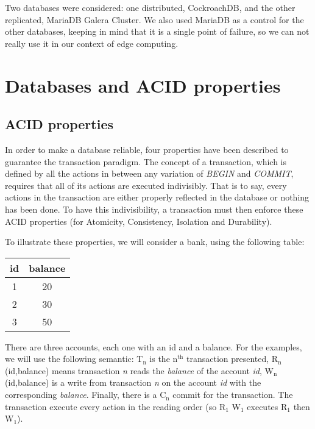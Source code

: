 Two databases were considered: one distributed, CockroachDB, and the other replicated, MariaDB Galera Cluster. We also used MariaDB as a control for the other databases, keeping in mind that it is a single point of failure, so we can not really use it in our context of edge computing.


\section{Databases and ACID properties}

\subsection{ACID properties}
In order to make a database reliable, four properties have been described to guarantee the transaction paradigm. The concept of a transaction, which is defined by all the actions in between any variation of \emph{BEGIN} and \emph{COMMIT}, requires that all of its actions are executed indivisibly. That is to say, every actions in the transaction are either properly reflected in the database or nothing has been done\cite{DBLP:journals/csur/HarderR83}. To have this indivisibility, a transaction must then enforce these ACID properties (for Atomicity, Consistency, Isolation and Durability).

To illustrate these properties, we will consider a bank, using the following table:

\begin{center}
\begin{tabular}{c | c}
id & balance\\
\hline
1 & 20\\
2 & 30\\
3 & 50\\
\end{tabular}
\end{center}

There are three accounts, each one with an id and a balance. For the examples, we will use the following semantic: T$_{\text{n}}$ is the n$^{\text{th}}$ transaction presented, R$_{\text{n}}$(id,balance) means transaction \emph{n} reads the \emph{balance} of the account \emph{id}, W$_{\text{n}}$(id,balance) is a write from transaction \emph{n} on the account \emph{id} with the corresponding \emph{balance}. Finally, there is a C$_{\text{n}}$ commit for the transaction. The transaction execute every action in the reading order (so R$_{\text{1}}$ W$_{\text{1}}$ executes R$_{\text{1}}$ then W$_{\text{1}}$).

